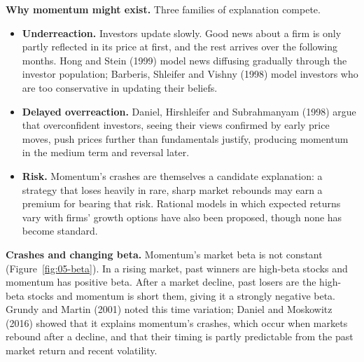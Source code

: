 \textbf{Why momentum might exist.} Three families of explanation compete.

\begin{itemize}
  \item \textbf{Underreaction.} Investors update slowly. Good news about a firm is only partly reflected in its price at first, and the rest arrives over the following months. Hong and Stein (1999) model news diffusing gradually through the investor population; Barberis, Shleifer and Vishny (1998) model investors who are too conservative in updating their beliefs.
  \item \textbf{Delayed overreaction.} Daniel, Hirshleifer and Subrahmanyam (1998) argue that overconfident investors, seeing their views confirmed by early price moves, push prices further than fundamentals justify, producing momentum in the medium term and reversal later.
  \item \textbf{Risk.} Momentum's crashes are themselves a candidate explanation: a strategy that loses heavily in rare, sharp market rebounds may earn a premium for bearing that risk. Rational models in which expected returns vary with firms' growth options have also been proposed, though none has become standard.
\end{itemize}

\textbf{Crashes and changing beta.} Momentum's market beta is not constant (Figure~\ref{fig:05-beta}). In a rising market, past winners are high-beta stocks and momentum has positive beta. After a market decline, past losers are the high-beta stocks and momentum is short them, giving it a strongly negative beta. Grundy and Martin (2001) noted this time variation; Daniel and Moskowitz (2016) showed that it explains momentum's crashes, which occur when markets rebound after a decline, and that their timing is partly predictable from the past market return and recent volatility.

